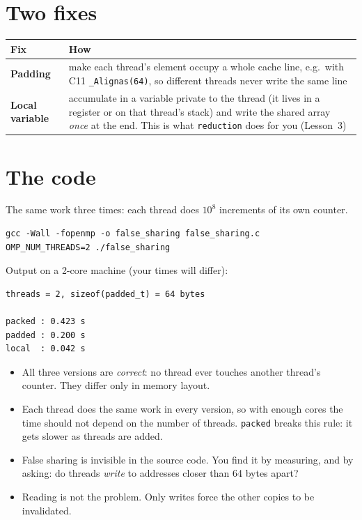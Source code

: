 \documentclass[11pt,a4paper]{article}
\begin{document}
\section{Two fixes}
\begin{center}
\small
\begin{tabular}{@{}>{\raggedright\arraybackslash}p{3.2cm}>{\raggedright\arraybackslash}p{12.0cm}@{}}
\toprule
Fix & How \\ \midrule
\textbf{Padding} & make each thread's element occupy a whole cache line, e.g.\ with
  C11 \texttt{\_Alignas(64)}, so different threads never write the same line \\
\textbf{Local variable} & accumulate in a variable private to the thread (it lives in a
  register or on that thread's stack) and write the shared array \emph{once} at the end.
  This is what \texttt{reduction} does for you (Lesson~3) \\
\bottomrule
\end{tabular}
\end{center}

\section{The code}
The same work three times: each thread does $10^8$ increments of its own counter.


\begin{lstlisting}[style=sh]
gcc -Wall -fopenmp -o false_sharing false_sharing.c
OMP_NUM_THREADS=2 ./false_sharing
\end{lstlisting}
Output on a 2-core machine (your times will differ):
\begin{lstlisting}[style=sh]
threads = 2, sizeof(padded_t) = 64 bytes

packed : 0.423 s
padded : 0.200 s
local  : 0.042 s
\end{lstlisting}

\begin{keyidea}
\begin{itemize}
  \item All three versions are \emph{correct}: no thread ever touches another thread's
        counter. They differ only in memory layout.
  \item Each thread does the same work in every version, so with enough cores the time
        should not depend on the number of threads. \texttt{packed} breaks this rule: it
        gets slower as threads are added.
  \item False sharing is invisible in the source code. You find it by measuring, and by
        asking: do threads \emph{write} to addresses closer than 64 bytes apart?
  \item Reading is not the problem. Only writes force the other copies to be invalidated.
\end{itemize}
\end{keyidea}
\end{document}
